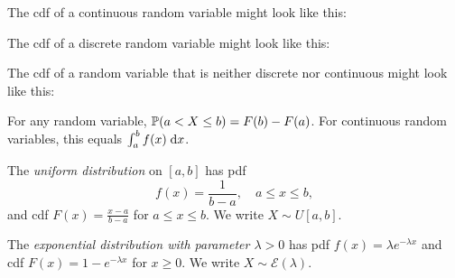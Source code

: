 \documentclass[a4paper]{article}
\begin{document}
\begin{eg}
  The cdf of a continuous random variable might look like this:
  \begin{center}
  \end{center}
  The cdf of a discrete random variable might look like this:
  \begin{center}
  \end{center}
  The cdf of a random variable that is neither discrete nor continuous might look like this:
  \begin{center}
  \end{center}
\end{eg}

\begin{remark}
  For any random variable, $\P(a < X \leq b) = F(b) - F(a)$.
  For continuous random variables, this equals $\int_a^b f(x)\;\d x$.
\end{remark}

\begin{defi}
  The \emph{uniform distribution} on $[a, b]$ has pdf
  \[
    f(x) = \frac{1}{b - a}, \quad a \leq x \leq b,
  \]
  and cdf $F(x) = \frac{x - a}{b - a}$ for $a \leq x \leq b$.
  We write $X \sim U[a, b]$.
\end{defi}

\begin{defi}
  The \emph{exponential distribution with parameter $\lambda > 0$} has pdf $f(x) = \lambda e^{-\lambda x}$ and cdf $F(x) = 1 - e^{-\lambda x}$ for $x \geq 0$.
  We write $X \sim \mathcal{E}(\lambda)$.
\end{defi}
\end{document}
